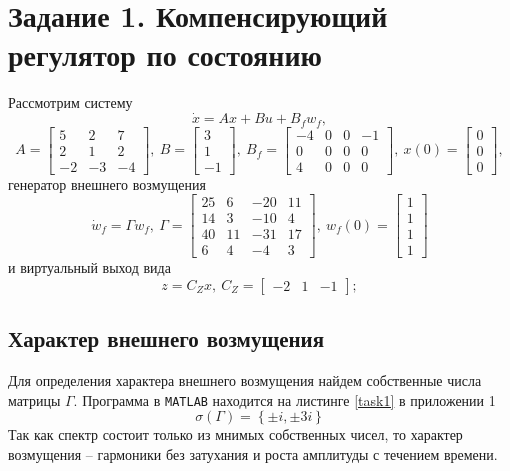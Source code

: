 \documentclass[a4paper, 12pt]{article}
\begin{document}
    \section{Задание 1. Компенсирующий регулятор по состоянию}
    Рассмотрим систему
    $$
    \dot{x}=Ax+Bu+B_f w_f,
    $$
    $$
    A=\begin{bmatrix}
        5 &2 &7\\
        2 &1 &2\\
        -2 &-3 &-4
    \end{bmatrix},\ B=\begin{bmatrix}
        3\\1\\-1
    \end{bmatrix},\ B_f=\begin{bmatrix}
        -4 &0 &0 &-1\\
        0 &0 &0 &0\\
        4 &0 &0 &0
    \end{bmatrix},\ x(0)=\begin{bmatrix}
        0\\0\\0
    \end{bmatrix},
    $$
    генератор внешнего возмущения
    $$
    \dot{ w}_f=\Gamma w_f,\ \Gamma=\begin{bmatrix}
        25 &6 &-20 &11\\
        14 &3 &-10 &4\\
        40 &11 &-31 &17\\
        6 &4 &-4 &3
    \end{bmatrix},\  w_f(0)=\begin{bmatrix}
        1\\1\\1\\1
    \end{bmatrix}
    $$
    и виртуальный выход вида
    $$
    z=C_Zx,\ C_Z=\begin{bmatrix}
        -2 &1 &-1
    \end{bmatrix};
    $$

    
    \subsection{Характер внешнего возмущения}
    Для определения характера внешнего возмущения найдем собственные числа матрицы $\Gamma$.
    Программа в \texttt{MATLAB} находится на листинге \ref{task1} в приложении 1
    $$
    \sigma\left( \Gamma \right)=\left\{ \pm i, \pm 3i \right\}
    $$
    Так как спектр состоит только из мнимых собственных чисел, то характер возмущения -- гармоники
    без затухания и роста амплитуды с течением времени.
\end{document}
